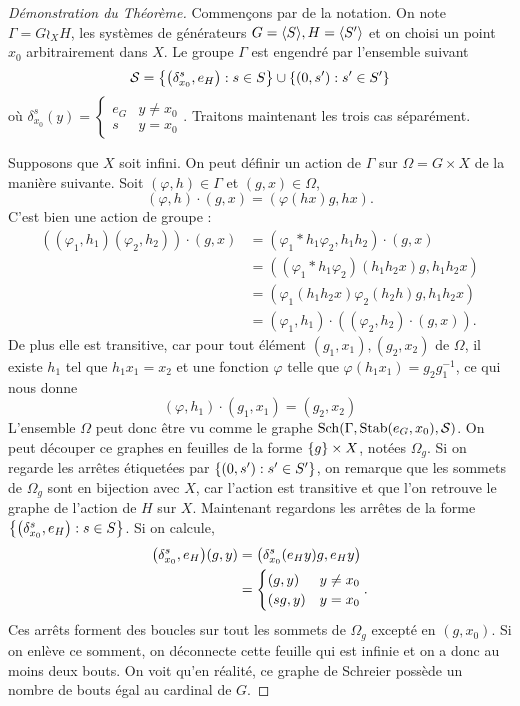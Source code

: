 \documentclass[a4paper]{article}
\theoremstyle{remark}%
\DeclareMathOperator\Sch{Sch}
\DeclareMathOperator\stab{Stab}
\DeclarePairedDelimiter\gen{\langle}{\rangle}
\DeclarePairedDelimiter\set{\lbrace}{\rbrace}
\DeclarePairedDelimiter\parent{\lparen}{\rparen}
\renewcommand*{\phi}{\varphi}
\renewcommand*{\S}{\mathcal{S}}
\begin{document}
\begin{proof}[Démonstration du Théorème]
Commençons par de la notation. On note $\Gamma = G \wr_X H$, les systèmes de générateurs $G=\gen{S}, H=\gen{S'}$ et on choisi un point $x_0$ arbitrairement dans $X$. Le groupe $\Gamma$ est engendré par l'ensemble suivant 
\begin{equation*}
\S=\set*{\left(\delta_{x_0}^s,e_H\right) : s \in S} \cup \set*{(0,s') : s' \in S'} 
\end{equation*}
où $\delta_{x_0}^s (y) = 
\begin{cases}
e_G &y \neq x_0 \\
s	&y=x_0
\end{cases}$.
Traitons maintenant les trois cas séparément.

Supposons que $X$ soit infini. On peut définir un action de $\Gamma$ sur $\Omega = G \times X$ de la manière suivante. Soit $(\phi,h) \in \Gamma$ et $(g,x) \in \Omega$,
%
\begin{equation*}
(\phi,h) \cdot (g,x) =(\phi(hx)g,hx).
\end{equation*}
%
C'est bien une action de groupe : 
%
\begin{align*}
\left( (\phi_1,h_1)(\phi_2,h_2)\right) \cdot (g,x) 	&= (\phi_1*h_1\phi_2,h_1h_2) \cdot (g,x) \\
												&= ((\phi_1*h_1\phi_2)(h_1h_2x) g, h_1h_2x) \\
												&= (\phi_1(h_1h_2x)  \phi_2(h_2h)  g, h_1h_2x) \\
												&=  (\phi_1,h_1)\cdot((\phi_2,h_2)\cdot(g,x)).
\end{align*}
%
De plus elle est transitive, car pour tout élément $(g_1,x_1),(g_2,x_2)$ de $\Omega$, il existe $h_1$ tel que $h_1x_1=x_2$ et une fonction $\phi$ telle que  $\phi(h_1x_1)=g_2g_1^{-1}$, ce qui nous donne
% 
\begin{equation*}
(\phi,h_1)\cdot(g_1,x_1)=(g_2,x_2)
\end{equation*}
%
L'ensemble $\Omega$ peut donc être vu comme le graphe $\Sch\parent*{\Gamma, \stab\parent*{e_G,x_0},\S}$. On peut découper ce graphes en feuilles de la forme $\set*{g} \times X$, notées $\Omega_g$. Si on regarde les arrêtes étiquetées par $\set*{(0,s') : s' \in S'}$, on remarque que les sommets de $\Omega_g$ sont en bijection avec $X$, car l'action est transitive et que l'on retrouve le graphe de l'action de $H$ sur $X$. Maintenant regardons les arrêtes de la forme $\set*{\parent*{\delta_{x_0}^s,e_H} : s \in S}$. Si on calcule,
\begin{align*}
\parent*{\delta_{x_0}^s,e_H}\parent*{g,y} 	&= \parent*{\delta_{x_0}^s(e_H y)g,e_Hy}	\\
											&= 
\begin{cases}
\parent*{g,y}	& y \neq x_0	\\
\parent*{sg,y}	& y = x_0
\end{cases}.
\end{align*}
Ces arrêts forment des boucles sur tout les sommets de $\Omega_g$ excepté en $(g,x_0)$. Si on enlève ce somment, on déconnecte cette feuille qui est infinie et on a donc au moins deux bouts. On voit qu'en réalité, ce graphe de Schreier possède un nombre de bouts égal au cardinal de $G$.


\end{proof}
\end{document}
